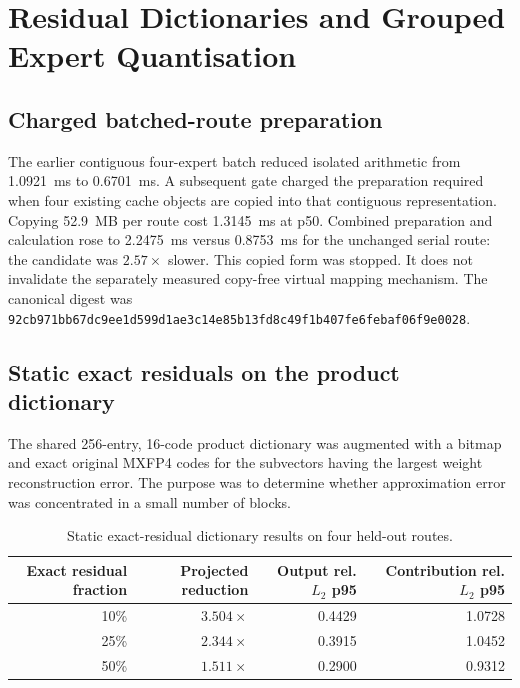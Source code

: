 
\section{Residual Dictionaries and Grouped Expert Quantisation}
\label{sec:gptoss120b-residual-grouped-quantisation}

\subsection{Charged batched-route preparation}

The earlier contiguous four-expert batch reduced isolated arithmetic from
1.0921~ms to 0.6701~ms.  A subsequent gate charged the preparation required
when four existing cache objects are copied into that contiguous representation.
Copying 52.9~MB per route cost 1.3145~ms at p50.  Combined preparation and
calculation rose to 2.2475~ms versus 0.8753~ms for the unchanged serial route:
the candidate was $2.57\times$ slower.  This copied form was stopped.  It does
not invalidate the separately measured copy-free virtual mapping mechanism.
The canonical digest was
\texttt{92cb971bb67dc9ee1d599d1ae3c14e85b13fd8c49f1b407fe6febaf06f9e0028}.

\subsection{Static exact residuals on the product dictionary}

The shared 256-entry, 16-code product dictionary was augmented with a bitmap
and exact original MXFP4 codes for the subvectors having the largest weight
reconstruction error.  The purpose was to determine whether approximation
error was concentrated in a small number of blocks.

\begin{table}[ht]
\centering
\begin{tabular}{@{}rrrr@{}}
\toprule
Exact residual fraction & Projected reduction & Output rel. $L_2$ p95 & Contribution rel. $L_2$ p95 \\
\midrule
10\% & $3.504\times$ & 0.4429 & 1.0728 \\
25\% & $2.344\times$ & 0.3915 & 1.0452 \\
50\% & $1.511\times$ & 0.2900 & 0.9312 \\
\bottomrule
\end{tabular}
\caption{Static exact-residual dictionary results on four held-out routes.}
\end{table}

